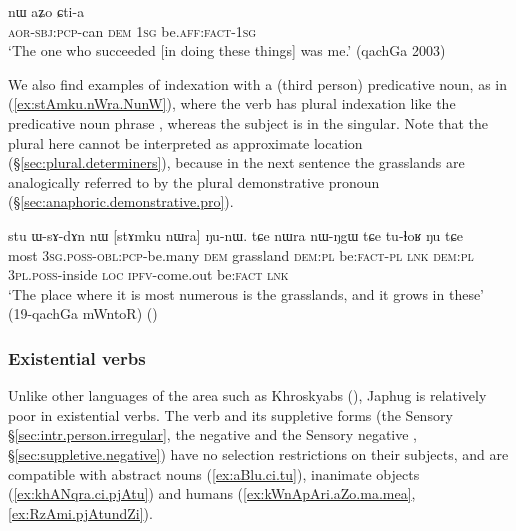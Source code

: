 \begin{exe}
\ex \label{ex:pWkWcha.nW}
\gll [pɯ-kɯ-cʰa] nɯ aʑo ɕti-a \\
\textsc{aor}-\textsc{sbj}:\textsc{pcp}-can \textsc{dem} \textsc{1sg} be.\textsc{aff}:\textsc{fact}-\textsc{1sg} \\
\glt `The one who succeeded [in doing these things] was me.' (qachGa 2003)
\end{exe}

We also find examples of indexation with a (third person) predicative noun, as in (\ref{ex:stAmku.nWra.NunW}), where the verb has plural indexation like the predicative noun phrase , whereas the subject is in the singular. Note that the plural  here cannot be interpreted as approximate location (§\ref{sec:plural.determiners}), because in the next sentence the grasslands are analogically referred to by the plural demonstrative pronoun  (§\ref{sec:anaphoric.demonstrative.pro}).

\begin{exe}
\ex \label{ex:stAmku.nWra.NunW}
\gll  stu ɯ-sɤ-dɤn nɯ [stɤmku nɯra] ŋu-nɯ. tɕe nɯra nɯ-ŋgɯ tɕe tu-ɬoʁ ŋu tɕe \\
most \textsc{3sg}.\textsc{poss}-\textsc{obl}:\textsc{pcp}-be.many \textsc{dem} grassland \textsc{dem}:\textsc{pl} be:\textsc{fact}-\textsc{pl} \textsc{lnk} \textsc{dem}:\textsc{pl} \textsc{3pl}.\textsc{poss}-inside \textsc{loc} \textsc{ipfv}-come.out be:\textsc{fact} \textsc{lnk} \\
\glt `The place where it is most numerous is the grasslands, and it grows in these' (19-qachGa mWntoR)
()
\end{exe}

\subsubsection{Existential verbs} \label{sec:existential.basic}
Unlike other languages of the area such as Khroskyabs (\citealt[250--252]{lai17khroskyabs}), Japhug is relatively poor in existential verbs. The verb  and its suppletive forms (the Sensory  §\ref{sec:intr.person.irregular}, the negative  and the Sensory negative ,  §\ref{sec:suppletive.negative}) have no selection restrictions on their  subjects, and are compatible  with abstract nouns (\ref{ex:aBlu.ci.tu}), inanimate objects (\ref{ex:khANqra.ci.pjAtu}) and  humans (\ref{ex:kWnApAri.aZo.ma.mea}, \ref{ex:RzAmi.pjAtundZi}).

